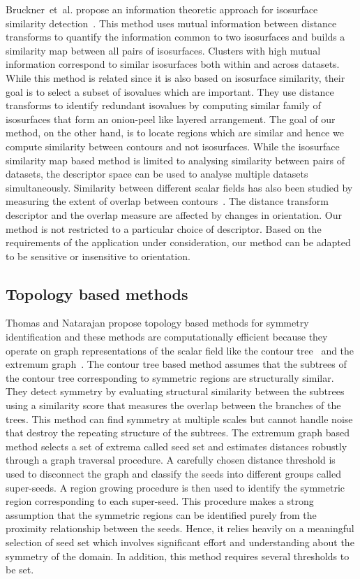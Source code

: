 \documentclass[review,journal]{vgtc}         %
\begin{document}
Bruckner~et~al. propose an information theoretic approach for isosurface similarity 
detection~\cite{BrucknerM10,haidacher11}. This method uses mutual information between distance 
transforms to quantify the information common to two isosurfaces and builds a similarity map 
between all pairs of isosurfaces. Clusters with high mutual information correspond to
similar isosurfaces both within and across datasets. {\color{blue}While this method is related since
it is also based on isosurface similarity, their goal is to select a subset of isovalues
which are important. They use distance transforms to identify redundant isovalues by
computing similar family of isosurfaces that form an onion-peel like layered arrangement. 
The goal of our method, on the other hand, is to locate regions which are similar and hence
we compute similarity between contours and not isosurfaces.} While the isosurface similarity map based
method is limited to analysing similarity between pairs of datasets, the descriptor space can 
be used to analyse multiple datasets simultaneously. Similarity between different scalar 
fields has also been studied by measuring the extent of overlap
between contours~\cite{SchneiderWCHS08,schn13}. The distance transform
descriptor and the overlap measure are affected by changes in orientation.
Our method is not restricted to a particular choice of descriptor. Based on the requirements of 
the application under consideration, our method  can be adapted to be sensitive or 
insensitive to orientation. 
\subsection{Topology based methods}
Thomas and Natarajan propose topology based methods for symmetry identification and these methods 
are computationally efficient because they operate on graph representations of the scalar field
like the contour tree~\cite{ThomN11} and the extremum graph~\cite{ThomN13}. The contour tree based method 
assumes that the subtrees of the contour tree corresponding to symmetric regions are structurally
similar. They detect symmetry by evaluating structural similarity between the subtrees using a 
similarity score that measures the overlap between the branches of the trees. 
This method can find symmetry at multiple scales but cannot handle
noise that destroy the repeating structure of the subtrees. The extremum 
graph based method selects a set of extrema called seed set and 
estimates distances robustly through a graph traversal procedure. A carefully chosen distance 
threshold is used to disconnect the graph and classify the seeds into different groups called 
super-seeds. A region growing procedure is then used to identify the symmetric region 
corresponding to each super-seed. This procedure makes a strong assumption that the symmetric regions
can be identified purely from the proximity relationship between the seeds. Hence,
it relies heavily on a meaningful selection of seed set which involves significant effort 
and understanding about the symmetry of the domain. In addition, this method requires several thresholds
to be set.
\end{document}
